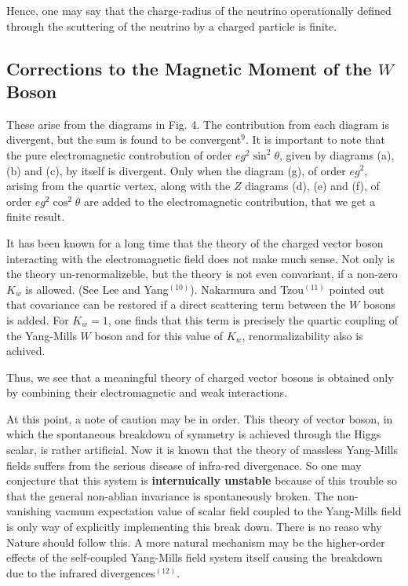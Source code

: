 Hence, one may say that the charge-radius of the neutrino operationally defined through the scuttering of the neutrino by a charged particle is finite.

\subsection*{Corrections to the Magnetic Moment of the $W$ Boson}

These arise from the diagrams in Fig. 4. The contribution from each diagram is divergent, but the sum is found to be convergent$^{9}$. It is important to note that the pure electromagnetic controbution of order $eg^{2} \sin^{2} \theta$, given by diagrams (a), (b) and (c), by itself is divergent. Only when the diagram (g), of order $eg^{2}$, arising from the quartic vertex, along with the $Z$ diagrams (d), (e) and (f), of order $eg^{2} \cos^{2} \theta$ are added to the electromagnetic contribution, that we get a finite result.

It has been known for a long time that the theory of the charged vector boson interacting with the electromagnetic field does not make much sense. Not only is the theory un-renormalizeble, but the theory is not even convariant, if a non-zero $K_{w}$ is allowed. (See Lee  and Yang$^{(10)}$). Nakarmura and Tzou$^{(11)}$ pointed out that covariance can be restored if a direct scattering term between  the $W$ bosons is added. For $K_{w}=1$, one finds that this term is precisely the quartic coupling of the Yang-Mills $W$  boson and for this value of $K_{w}$, renormalizability also is achived.

Thus, we see that a meaningful theory of charged vector bosons is obtained only by combining their electromagnetic and weak interactions.

At this point, a note of caution may be in order. This theory of vector boson, in which the spontaneous breakdown of symmetry is achieved through the Higgs scalar, is rather artificial. Now it is known that the theory of massless Yang-Mills fields suffers from the serious disease of infra-red divergenace. So one may conjecture that this system is \textbf{internuically unstable} because of this trouble so that the general non-ablian invariance is spontaneously broken. The non-vanishing vacmum expectation value of scalar field coupled to the Yang-Mills field is only way of explicitly implementing this break down. There is no reaso why Nature should follow this. A more natural mechanism may be the higher-order effects of the self-coupled Yang-Mills field system itself causing the breakdown due to the infrared divergences$^{(12)}$.


